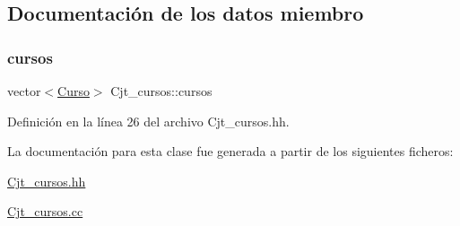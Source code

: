 \subsection{Documentación de los datos miembro}
\mbox{\label{class_cjt__cursos_a582f9540bc295212450dba4cd18c8886}} 
\subsubsection{\texorpdfstring{cursos}{cursos}}
{\footnotesize\ttfamily vector$<$\mbox{\hyperlink{class_curso}{Curso}}$>$ Cjt\+\_\+cursos\+::cursos\hspace{0.3cm}{\ttfamily [private]}}



Definición en la línea 26 del archivo Cjt\+\_\+cursos.\+hh.



La documentación para esta clase fue generada a partir de los siguientes ficheros\+:\begin{DoxyCompactItemize}
\item 
\mbox{\hyperlink{_cjt__cursos_8hh}{Cjt\+\_\+cursos.\+hh}}\item 
\mbox{\hyperlink{_cjt__cursos_8cc}{Cjt\+\_\+cursos.\+cc}}\end{DoxyCompactItemize}

